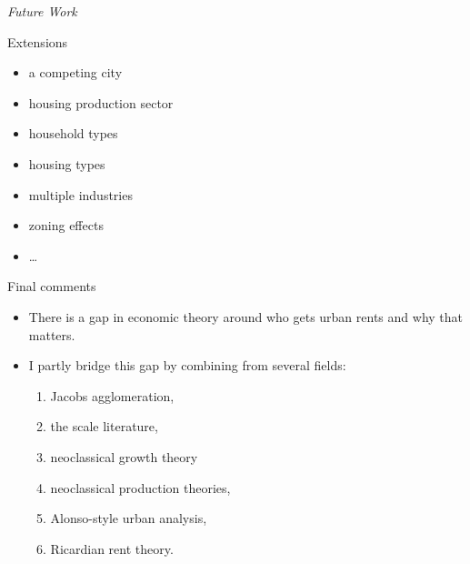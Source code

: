 \documentclass[hide notes=show/only]{beamer} %
\begin{document}
\begin{frame}{}
  \centering \Large
  \emph{Future Work}
\end{frame}
\begin{frame}{Extensions}
 \begin{center}
    \begin{minipage}{0.6\textwidth}
 \hspace{3cm}\begin{itemize}\Large 
      \item a competing city
      \item housing production sector
      \item household types
      \item housing types
      \item multiple industries
      \item zoning effects
      \item \dots
  \end{itemize}
 \end{minipage}
  \end{center}
\end{frame}
\begin{frame}{Final comments}
 \begin{itemize} \Large
\item There is a gap in economic theory around who gets urban rents and why that matters.
\item I partly bridge this gap by combining from several  fields:

    \begin{enumerate}\item Jacobs agglomeration, 
    
    \item the scale literature, 
    
    \item neoclassical growth theory
    
    \item neoclassical production theories, 
    
    \item Alonso-style urban analysis, 
    
    \item Ricardian rent theory. 
    \end{enumerate}
\end{itemize}
\end{frame}
\end{document}

